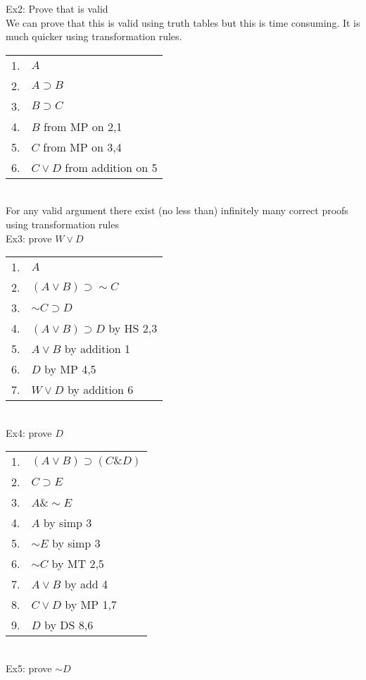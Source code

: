 Ex2: Prove that  is valid\\
We can prove that this is valid using truth tables but this is time consuming. It is much quicker using transformation rules.\\
\begin{tabular}{cl}
    1. & $A$\\
    2. & $A\supset B$\\
    3. & $B\supset C$\\
    \hline
    4. & $B$ from MP on 2,1\\
    5. & $C$ from MP on 3,4\\
    6. & $C\vee D$ from addition on 5
\end{tabular}\\
For any valid argument there exist (no less than) infinitely many correct proofs using transformation rules\\
Ex3: prove $W\vee D$\\
\begin{tabular}{cl}
    1. & $A$\\
    2. & $(A\vee B)\supset \sim C$\\
    3. & $\sim C \supset D$\\
    \hline
    4. & $(A\vee B)\supset D$ by HS 2,3\\
    5. & $A\vee B$ by addition 1\\
    6. & $D$ by MP 4,5\\
    7. & $W\vee D$ by addition 6
\end{tabular}\\
Ex4: prove $D$\\
\begin{tabular}{cl}
    1. & $(A\vee B)\supset(C\& D)$\\
    2. & $C\supset E$\\
    3. & $A\&\sim E$\\
    \hline
    4. & $A$ by simp 3\\
    5. & $\sim E$ by simp 3\\
    6. & $\sim C$ by MT 2,5\\
    7. & $A\vee B$ by add 4\\
    8. & $C\vee D$ by MP 1,7\\
    9. & $D$ by DS 8,6
\end{tabular}\\
Ex5: prove $\sim D$\\
